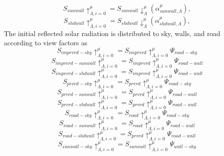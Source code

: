 \documentclass[12pt,authoryear]{elsarticle}
\numberwithin{equation}{section} %
\begin{document}
\begin{equation}
S_{sunwall}\uparrow_{\Lambda,i=0}^{\mu}=S_{sunwall}\downarrow_{\Lambda}^{\mu}(\alpha_{sunwall,\Lambda}^{\mu}),
\end{equation}
\begin{equation}
S_{shdwall}\uparrow_{\Lambda,i=0}^{\mu}=S_{shdwall}\downarrow_{\Lambda}^{\mu}(\alpha_{shdwall,\Lambda}^{\mu}),
\end{equation}
The initial reflected solar radiation is distributed to sky, walls, and road according to view factors as
\begin{equation}
S_{imprvrd-sky}\uparrow_{\Lambda,i=0}^{\mu}=S_{imprvrd}\uparrow_{\Lambda,i=0}^{\mu}\Psi_{road-sky}
\end{equation}
\begin{equation}
S_{imprvrd-sunwall}\uparrow_{\Lambda,i=0}^{\mu}=S_{imprvrd}\uparrow_{\Lambda,i=0}^{\mu}\Psi_{road-wall}
\end{equation}
\begin{equation}
S_{imprvrd-shdwall}\uparrow_{\Lambda,i=0}^{\mu}=S_{imprvrd}\uparrow_{\Lambda,i=0}^{\mu}\Psi_{road-wall}
\end{equation}
\begin{equation}
S_{prvrd-sky}\uparrow_{\Lambda,i=0}^{\mu}=S_{prvrd}\uparrow_{\Lambda,i=0}^{\mu}\Psi_{road-sky}
\end{equation}
\begin{equation}
S_{prvrd-sunwall}\uparrow_{\Lambda,i=0}^{\mu}=S_{prvrd}\uparrow_{\Lambda,i=0}^{\mu}\Psi_{road-wall}
\end{equation}
\begin{equation}
S_{prvrd-shdwall}\uparrow_{\Lambda,i=0}^{\mu}=S_{prvrd}\uparrow_{\Lambda,i=0}^{\mu}\Psi_{road-wall}
\end{equation}
\begin{equation}
S_{road-sky}\uparrow_{\Lambda,i=0}^{\mu}=S_{road}\uparrow_{\Lambda,i=0}^{\mu}\Psi_{road-sky}
\end{equation}
\begin{equation}
S_{road-sunwall}\uparrow_{\Lambda,i=0}^{\mu}=S_{road}\uparrow_{\Lambda,i=0}^{\mu}\Psi_{road-wall}
\end{equation}
\begin{equation}
S_{road-shdwall}\uparrow_{\Lambda,i=0}^{\mu}=S_{prvrd}\uparrow_{\Lambda,i=0}^{\mu}\Psi_{road-wall}
\end{equation}
\begin{equation}
S_{sunwall-sky}\uparrow_{\Lambda,i=0}^{\mu}=S_{sunwall}\uparrow_{\Lambda,i=0}^{\mu}\Psi_{wall-sky}
\end{equation}
\end{document}
